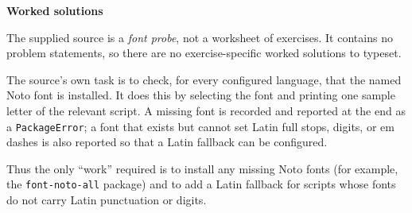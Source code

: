 \documentclass[11pt]{article}
\begin{document}
{\large\bfseries Worked solutions}\par\medskip
The supplied source is a \emph{font probe}, not a worksheet of exercises. It contains no problem statements, so there are no exercise-specific worked solutions to typeset.

The source's own task is to check, for every configured language, that the named Noto font is installed. It does this by selecting the font and printing one sample letter of the relevant script. A missing font is recorded and reported at the end as a \texttt{PackageError}; a font that exists but cannot set Latin full stops, digits, or em dashes is also reported so that a Latin fallback can be configured.

Thus the only ``work'' required is to install any missing Noto fonts (for example, the \texttt{font-noto-all} package) and to add a Latin fallback for scripts whose fonts do not carry Latin punctuation or digits.
\end{document}

